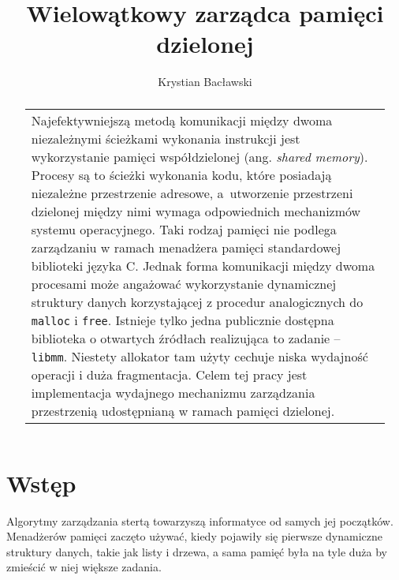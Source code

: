 \documentclass[12pt,a4paper,titlepage,twoside]{mwart}
\author{Krystian Bacławski}
\title{Wielowątkowy zarządca pamięci dzielonej}
\date{}
\begin{document}
\maketitle
\cleardoublepage


\begin{abstract}
\vspace{2ex}
\begin{center}
\begin{tabularx}{0.75\textwidth}{X}
Najefektywniejszą metodą komunikacji między dwoma niezależnymi ścieżkami
wykonania instrukcji jest wykorzystanie pamięci współdzielonej (ang.
\textit{shared memory}). Procesy są to ścieżki wykonania kodu, które posiadają
niezależne przestrzenie adresowe, a~utworzenie przestrzeni dzielonej między
nimi wymaga odpowiednich mechanizmów systemu operacyjnego. Taki rodzaj pamięci
nie podlega zarządzaniu w ramach menadżera pamięci standardowej biblioteki
języka C. Jednak forma komunikacji między dwoma procesami może angażować
wykorzystanie dynamicznej struktury danych korzystającej z procedur
analogicznych do \texttt{malloc} i \texttt{free}. Istnieje tylko jedna
publicznie dostępna biblioteka o otwartych źródłach realizująca to zadanie --
\texttt{libmm}. Niestety allokator tam użyty cechuje niska wydajność operacji i
duża fragmentacja. Celem tej pracy jest implementacja wydajnego mechanizmu
zarządzania przestrzenią udostępnianą w ramach pamięci dzielonej. 
\end{tabularx}
\end{center}
\end{abstract}


\tableofcontents
\cleardoublepage


\setlength{\parindent}{0pt}
\setlength{\parskip}{1.2ex plus 0.5ex minus 0.2ex}

\section{Wstęp}

Algorytmy zarządzania stertą towarzyszą informatyce od samych jej początków.
Menadżerów pamięci zaczęto używać, kiedy pojawiły się pierwsze dynamiczne
struktury danych, takie jak listy i drzewa, a sama pamięć była na tyle duża by
zmieścić w niej większe zadania.
\end{document}
